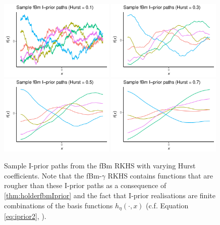 \begin{figure}[hbt]
  \centering
  \includegraphics[width=0.49\textwidth]{figure/02-kernel_path_fbm_1}
  \includegraphics[width=0.49\textwidth]{figure/02-kernel_path_fbm_3}
  \includegraphics[width=0.49\textwidth]{figure/02-kernel_path_fbm_5}
  \includegraphics[width=0.49\textwidth]{figure/02-kernel_path_fbm_7}
  \caption[Sample I-prior paths from the fBm RKHS with varying Hurst coefficients.]{Sample I-prior paths from the fBm RKHS with varying Hurst coefficients. Note that the fBm-$\gamma$ RKHS contains functions that are rougher than these I-prior paths as a consequence of \cref{thm:holderfbmIprior} and the fact that I-prior realisations are finite combinations of the basis functions $h_\eta(\cdot,x)$ (c.f. {\color{\mycitecolour} Equation} \ref{eq:iprior2}, ).}
\end{figure}

